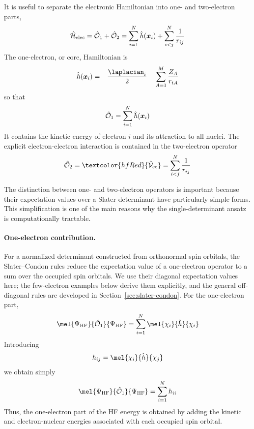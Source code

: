 \documentclass[11pt,a4paper,titlepage]{article}
\numberwithin{equation}{section}
\newcommand{\bx}{\boldsymbol{x}}
\newcommand{\hh}{\Hat{h}}
\newcommand{\chO}{\Hat{\mathcal{O}}}
\newcommand{\chH}{\Hat{\mathcal{H}}}
\newcommand{\chV}{\Hat{\mathcal{V}}}
\newcommand{\red}[1]{\textcolor{hfRed}{#1}}
\begin{document}
It is useful to separate the electronic Hamiltonian into one- and
two-electron parts,
\begin{equation}
  \chH_\text{elec}
  =
  \chO_1+\chO_2
  =
  \sum_{i=1}^{N}\hh(\bx_i)
  +
  \sum_{i<j}^{N}\frac{1}{r_{ij}}
  \label{eq:one-two-electron-hamiltonian}
\end{equation}
The one-electron, or core, Hamiltonian is
\begin{equation}
  \hh(\bx_i)
  =
  -\frac{\laplacian_i}{2}
  -
  \sum_{A=1}^{M}\frac{Z_A}{r_{iA}}
\end{equation}
so that
\begin{equation}
  \chO_1
  =
  \sum_{i=1}^{N}\hh(\bx_i)
\end{equation}
It contains the kinetic energy of electron $i$ and its attraction to all
nuclei. The explicit electron-electron interaction is contained in the
two-electron operator
\begin{equation}
  \chO_2
  =
  \red{\chV_\text{ee}}
  =
  \sum_{i<j}^{N}\frac{1}{r_{ij}}
\end{equation}

The distinction between one- and two-electron operators is important because
their expectation values over a Slater determinant have particularly simple
forms. This simplification is one of the main reasons why the
single-determinant ansatz is computationally tractable.

\paragraph{One-electron contribution.}

For a normalized determinant constructed from orthonormal spin orbitals, the
Slater--Condon rules reduce the expectation value of a one-electron operator
to a sum over the occupied spin orbitals. We use their diagonal expectation
values here; the few-electron examples below derive them explicitly, and
the general off-diagonal rules are developed in
Section~\ref{sec:slater-condon}.
For the one-electron part,
\begin{equation}
  \mel{\Psi_\text{HF}}{\chO_1}{\Psi_\text{HF}}
  =
  \sum_{i=1}^{N}
  \mel{\chi_i}{\hh}{\chi_i}
\end{equation}
Introducing
\begin{equation}
  h_{ij}
  =
  \mel{\chi_i}{\hh}{\chi_j}
\end{equation}
we obtain simply
\begin{equation}
  \mel{\Psi_\text{HF}}{\chO_1}{\Psi_\text{HF}}
  =
  \sum_{i=1}^{N}h_{ii}
  \label{eq:hf-one-electron-energy}
\end{equation}
Thus, the one-electron part of the HF energy is obtained by adding the kinetic
and electron-nuclear energies associated with each occupied spin orbital.
\end{document}
